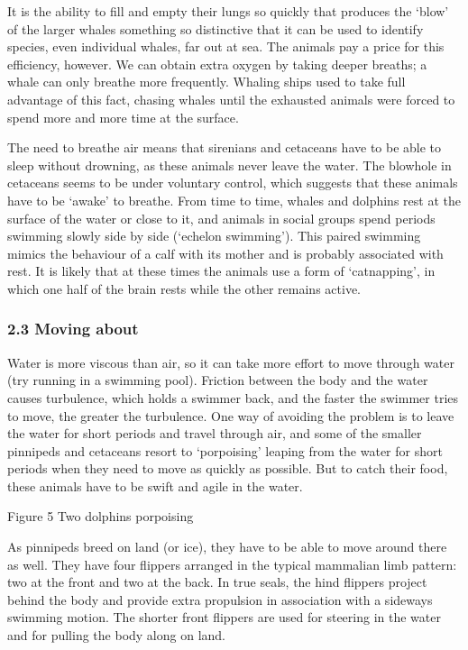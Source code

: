 \documentclass[letterpaper,10pt,english]{sphinxmanual}
\let\sphinxpxdimen\pdfpxdimen\else\newdimen\sphinxpxdimen
\begin{document}
It is the ability to fill and empty their lungs so quickly that produces the ‘blow’ of the larger whales \textendash{} something so distinctive that it can be used to identify species, even individual whales, far out at sea. The animals pay a price for this efficiency, however. We can obtain extra oxygen by taking deeper breaths; a whale can only breathe more frequently. Whaling ships used to take full advantage of this fact, chasing whales until the exhausted animals were forced to spend more and more time
at the surface.

The need to breathe air means that sirenians and cetaceans have to be able to sleep without drowning, as these animals never leave the water. The blowhole in cetaceans seems to be under voluntary control, which suggests that these animals have to be ‘awake’ to breathe. From time to time, whales and dolphins rest at the surface of the water or close to it, and animals in social groups spend periods swimming slowly side by side (‘echelon swimming’). This paired swimming mimics the behaviour of a
calf with its mother and is probably associated with rest. It is likely that at these times the animals use a form of ‘cat\sphinxhyphen{}napping’, in which one half of the brain rests while the other remains active.


\subsubsection{2.3 Moving about}
\label{\detokenize{content/session_00/Part_00_02:2.3-Moving-about}}
Water is more viscous than air, so it can take more effort to move through water (try running in a swimming pool). Friction between the body and the water causes turbulence, which holds a swimmer back, and the faster the swimmer tries to move, the greater the turbulence. One way of avoiding the problem is to leave the water for short periods and travel through air, and some of the smaller pinnipeds and cetaceans resort to ‘porpoising’ \textendash{} leaping from the water for short periods when they need to
move as quickly as possible. But to catch their food, these animals have to be swift and agile in the water.

\sphinxincludegraphics[width=512\sphinxpxdimen,height=341\sphinxpxdimen]{{s182_11_figure_6_porpoising}.jpg}

Figure 5 Two dolphins porpoising

As pinnipeds breed on land (or ice), they have to be able to move around there as well. They have four flippers arranged in the typical mammalian limb pattern: two at the front and two at the back. In true seals, the hind flippers project behind the body and provide extra propulsion in association with a sideways swimming motion. The shorter front flippers are used for steering in the water and for pulling the body along on land.
\end{document}
